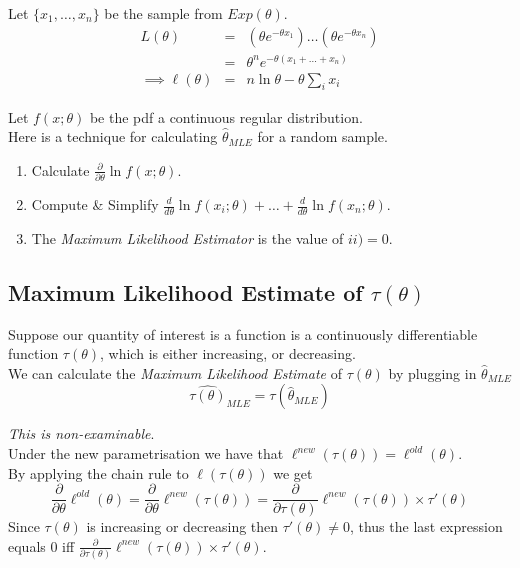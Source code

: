 \documentclass[11pt,a4paper]{article}
\begin{document}
Let $\{x_1,\dots,x_n\}$ be the sample from $Exp(\theta)$.
\[\begin{array}{rcl}
L(\theta)&=&(\theta e^{-\theta x_1})\dots(\theta e^{-\theta x_n})\\
&=&\theta^ne^{-\theta(x_1+\dots+x_n)}\\
\implies\ell(\theta)&=&n\ln\theta-\theta\sum_ix_i
\end{array}\]

Let $f(x;\theta)$ be the pdf a continuous regular distribution.\\
Here is a technique for calculating $\hat{\theta}_{MLE}$ for a random sample.
\begin{enumerate}[label=\roman*)]
	\item Calculate $\frac{\partial}{\partial\theta}\ln f(x;\theta)$.
	\item Compute \& Simplify $\frac{d}{d\theta}\ln f(x_i;\theta)+\dots+\frac{d}{d\theta}\ln f(x_n;\theta)$.
	\item The \textit{Maximum Likelihood Estimator} is the value of $ii)=0$.
\end{enumerate}

\subsection{Maximum Likelihood Estimate of $\tau(\theta)$}

Suppose our quantity of interest is a function is a continuously differentiable function $\tau(\theta)$, which is either increasing, or decreasing.\\
We can calculate the \textit{Maximum Likelihood Estimate} of $\tau(\theta)$ by plugging in $\hat{\theta}_{MLE}$
$$\widehat{\tau(\theta)}_{MLE}=\tau(\hat{\theta}_{MLE})$$

\textit{This is non-examinable}.\\
Under the new parametrisation we have that $\ell^{new}(\tau(\theta))=\ell^{old}(\theta)$.\\
By applying the chain rule to $\ell(\tau(\theta))$ we get
$$\frac{\partial}{\partial\theta}\ell^{old}(\theta)=\frac{\partial}{\partial\theta}\ell^{new}(\tau(\theta))=\frac{\partial}{\partial\tau(\theta)}\ell^{new}(\tau(\theta))\times\tau'(\theta)$$
Since $\tau(\theta)$ is increasing or decreasing then $\tau'(\theta)\neq0$, thus the last expression equals 0 iff $\frac{\partial}{\partial\tau(\theta)}\ell^{new}(\tau(\theta))\times\tau'(\theta)$.\\
\end{document}
